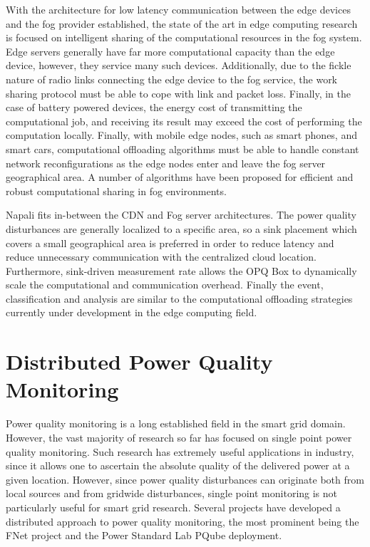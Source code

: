 With the architecture for low latency communication between the edge devices and the fog provider established, the state of the art in edge computing research is focused on intelligent sharing of the computational resources in the fog system.
Edge servers generally have far more computational capacity than the edge device, however, they service many such devices.
Additionally, due to the fickle nature of radio links connecting the edge device to the fog service, the work sharing protocol must be able to cope with link and packet loss.
Finally, in the case of battery powered devices, the energy cost of transmitting the computational job, and receiving its result may exceed the cost of performing the computation locally.
Finally, with mobile edge nodes, such as smart phones, and smart cars, computational offloading algorithms must be able to handle constant network reconfigurations as the edge nodes enter and leave the fog server geographical area.
A number of algorithms have been proposed for efficient and robust computational sharing in fog environments. \cite{oueis2015fog} \cite{wang2015mobiscud} \cite{wang2013mobile}

Napali fits in-between the CDN and Fog server architectures.
The power quality disturbances are generally localized to a specific area, so a sink placement which covers a small geographical area is preferred in order to reduce latency and reduce unnecessary communication with the centralized cloud location.
Furthermore, sink-driven measurement rate allows the OPQ Box to dynamically scale the computational and communication overhead.
Finally the event, classification and analysis are similar to the computational offloading strategies currently under development in the edge computing field.

\section{Distributed Power Quality Monitoring}\label{sec:distributed-power-quality-monitoring}

Power quality monitoring is a long established field in the smart grid domain.
However, the vast majority of research so far has focused on single point power quality monitoring.\cite{silva2017development} Such research has extremely useful applications in industry, since it allows one to ascertain the absolute quality of the delivered power at a given location.
However, since power quality disturbances can originate both from local sources and from gridwide disturbances, single point monitoring is not particularly useful for smart grid research.
Several projects have developed a distributed approach to power quality monitoring, the most prominent being the FNet project and the Power Standard Lab PQube deployment.



